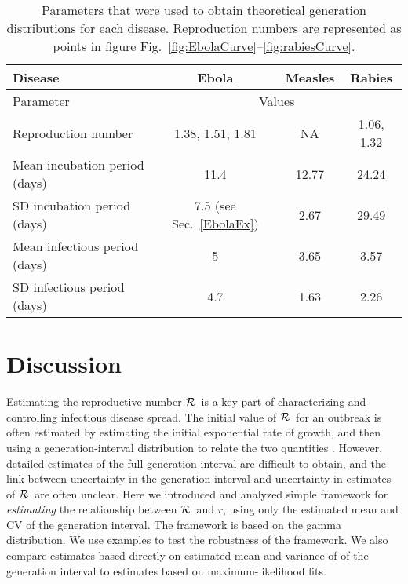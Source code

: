 \documentclass[12pt]{article}
\newcommand{\RR}{\ensuremath{{\cal R}}}
\newcommand{\sref}[1]{Sec.~\ref{#1}}
\newcommand{\frange}[2]{Fig.~\ref{fig:#1}--\ref{fig:#2}}
\newcommand{\tlab}[1]{\label{tab:#1}}
\begin{document}
\begin{table}[h!]
\centering
\begin{tabular}{l*{3}{c}}
\hline
Disease & Ebola & Measles & Rabies\\
\hline
Parameter & \multicolumn{3}{c}{Values}\\
\hline
Reproduction number & 1.38, 1.51, 1.81 \cite{AylwBarb14} & NA & 1.06, 1.32 \cite{HampDush09} \\
Mean incubation period (days) & 11.4 \cite{AylwBarb14} & 12.77 \cite{LessReic09}  & 24.24 \cite{HampDush09} \\
SD incubation period (days) & 7.5 (see \sref{EbolaEx}) & 2.67 \cite{LessReic09} & 29.49 \cite{HampDush09} \\
Mean infectious period (days) & 5 \cite{AylwBarb14} & 3.65 \cite{Lloy01} & 3.57 \cite{HampDush09} \\
SD infectious period (days) & 4.7 \cite{AylwBarb14} & 1.63 \cite{Lloy01} & 2.26 \cite{HampDush09}
\end{tabular}
\caption{Parameters that were used to obtain theoretical generation distributions for each disease. Reproduction numbers are represented as points in figure \frange{EbolaCurve}{rabiesCurve}.}
\tlab{parameters}
\end{table}

\section{Discussion}

Estimating the reproductive number \RR\ is a key part of characterizing and controlling infectious disease spread. The initial value of \RR\ for an outbreak is often estimated by estimating the initial exponential rate of growth, and then using a generation-interval distribution to relate the two quantities \cite{WallLips07,Sven07,Nish10,Sven15}.
However, detailed estimates of the full generation interval are difficult to obtain, and the link between uncertainty in the generation interval and uncertainty in estimates of \RR\ are often unclear.
Here we introduced and analyzed simple framework for \emph{estimating} the relationship between \RR\ and $r$, using only the estimated mean and CV of the generation interval. The framework is based on the gamma distribution. We use examples to test the robustness of the framework. We also compare estimates based directly on estimated mean and variance of of the generation interval to estimates based on maximum-likelihood fits.
\end{document}

